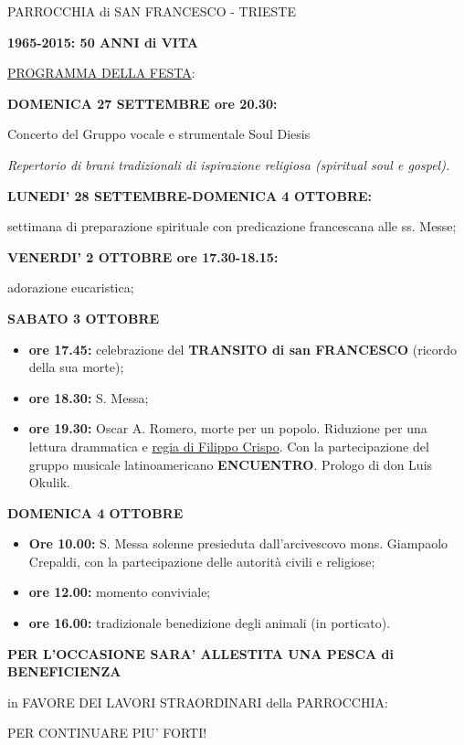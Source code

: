 \documentclass[17pt,titlepage,extrafontsizes]{memoir}
\begin{document}
\pagestyle{empty}
\begin{center}
{\LARGE PARROCCHIA di SAN FRANCESCO - TRIESTE\par
\vspace{1cm}
\textbf{1965-2015: 50 ANNI di VITA}}
\end{center}
\vfill
{\Large \ul{PROGRAMMA DELLA FESTA}:}
\par\bigskip\bigskip
\textbf{\Large DOMENICA 27 SETTEMBRE ore 20.30:}
\par\medskip
{\large Concerto del  Gruppo vocale e strumentale Soul Diesis\par}
\textit{Repertorio di brani tradizionali di ispirazione religiosa (spiritual soul e gospel).}
\par\bigskip\bigskip
\textbf{\Large LUNEDI’ 28 SETTEMBRE-DOMENICA 4 OTTOBRE:}
\par\medskip
{\large settimana di preparazione spirituale con predicazione francescana alle ss. Messe;}
\par\bigskip\bigskip
\textbf{\Large VENERDI’ 2 OTTOBRE ore 17.30-18.15:}
\par\medskip
{\large adorazione eucaristica;}
\par\bigskip\bigskip
\textbf{\Large SABATO 3 OTTOBRE}
\par\medskip
\begin{itemize}
 \large
 \item \textbf{ore 17.45:} celebrazione del \textbf{TRANSITO di san FRANCESCO} (ricordo della sua morte);
 \item \textbf{ore 18.30:} S. Messa;
 \item \textbf{ore 19.30:} Oscar A. Romero, morte per un popolo. Riduzione per una lettura drammatica e \ul{regia di Filippo Crispo}. 
 Con la partecipazione del gruppo musicale latinoamericano \textbf{ENCUENTRO}. Prologo di don Luis Okulik.
\end{itemize}
\par\bigskip\bigskip
\textbf{\Large DOMENICA 4 OTTOBRE}
\par\medskip
\begin{itemize}
 \large
 \item \textbf{Ore 10.00:} S. Messa solenne presieduta dall’arcivescovo mons. Giampaolo Crepaldi, con la partecipazione delle autorità civili e religiose;
 \item \textbf{ore 12.00:} momento conviviale;
 \item \textbf{ore 16.00:} tradizionale benedizione degli animali (in porticato).
\end{itemize}
\vfill
\begin{center}
\large\bfseries 
PER L’OCCASIONE SARA’ ALLESTITA UNA PESCA di BENEFICIENZA\par
in FAVORE DEI LAVORI STRAORDINARI della PARROCCHIA:\par
\Large PER CONTINUARE PIU’ FORTI!
\end{center}
\vfill
\newpage
\end{document}
